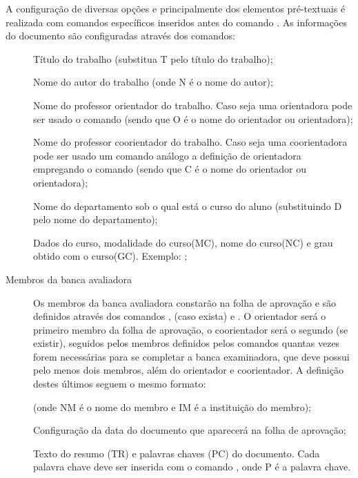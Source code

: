 A configuração de diversas opções e principalmente dos elementos pré-textuais é realizada com comandos específicos inseridos antes do comando . As informações do documento são configuradas através dos comandos:
\begin{description}
 \item[] Título do trabalho (substitua T pelo título do trabalho);
 \item[] Nome do autor do trabalho (onde N é o nome do autor);
 \item[] Nome do professor orientador do trabalho. Caso seja uma orientadora pode ser usado o comando  (sendo que O é o nome do orientador ou orientadora);
 \item[] Nome do professor coorientador do trabalho. Caso seja uma coorientadora pode ser usado um comando análogo a definição de orientadora  empregando o comando (sendo que C é o nome do orientador ou orientadora);
 \item[] Nome do departamento sob o qual está o curso do aluno (substituindo D pelo nome do departamento);
 
 \item[] Dados do curso, modalidade do curso(MC), nome do curso(NC) e grau obtido com o curso(GC). Exemplo: ;
 
 \item[Membros da banca avaliadora] Os membros da banca avaliadora constarão na folha de aprovação e são definidos através dos comandos ,  (caso exista) e . O orientador será o primeiro membro da folha de aprovação, o coorientador será o segundo (se existir), seguidos pelos membros definidos pelos comandos quantas vezes forem necessárias para se completar a banca examinadora, que deve possui pelo menos dois membros, além do orientador e coorientador. A definição destes últimos seguem o mesmo formato:
 
 (onde NM é o nome do membro e IM é a instituição do membro);
 \item[] Configuração da data do documento que aparecerá na folha de aprovação;
 \item[] Texto do resumo (TR) e palavras chaves (PC) do documento. Cada palavra chave deve ser inserida com o comando , onde P é a palavra chave.
\end{description}